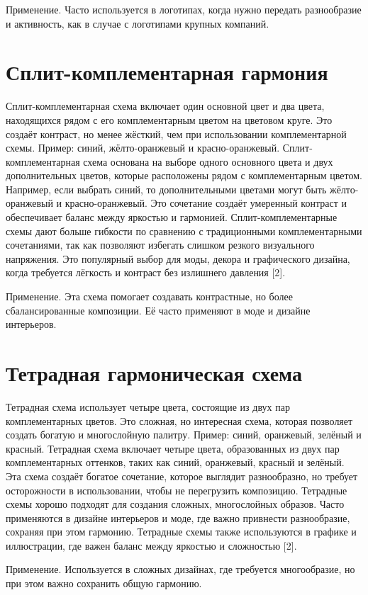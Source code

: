 \documentclass[bachelor, och, referat]{SCWorks}
\begin{document}
Применение. Часто используется в логотипах, когда нужно передать разнообразие и активность, как в случае с логотипами крупных компаний.

\section{Сплит-комплементарная гармония}
Сплит-комплементарная схема включает один основной цвет и два цвета, находящихся рядом с его комплементарным цветом на цветовом круге. Это создаёт контраст, но менее жёсткий, чем при использовании комплементарной схемы. Пример: синий, жёлто-оранжевый и красно-оранжевый.
Сплит-комплементарная схема основана на выборе одного основного цвета и двух дополнительных цветов, которые расположены рядом с комплементарным цветом. Например, если выбрать синий, то дополнительными цветами могут быть жёлто-оранжевый и красно-оранжевый. Это сочетание создаёт умеренный контраст и обеспечивает баланс между яркостью и гармонией.
Сплит-комплементарные схемы дают больше гибкости по сравнению с традиционными комплементарными сочетаниями, так как позволяют избегать слишком резкого визуального напряжения. Это популярный выбор для моды, декора и графического дизайна, когда требуется лёгкость и контраст без излишнего давления [2].

Применение. Эта схема помогает создавать контрастные, но более сбалансированные композиции. Её часто применяют в моде и дизайне интерьеров.

\section{Тетрадная гармоническая схема}
Тетрадная схема использует четыре цвета, состоящие из двух пар комплементарных цветов. Это сложная, но интересная схема, которая позволяет создать богатую и многослойную палитру. Пример: синий, оранжевый, зелёный и красный.
Тетрадная схема включает четыре цвета, образованных из двух пар комплементарных оттенков, таких как синий, оранжевый, красный и зелёный. Эта схема создаёт богатое сочетание, которое выглядит разнообразно, но требует осторожности в использовании, чтобы не перегрузить композицию. Тетрадные схемы хорошо подходят для создания сложных, многослойных образов.
Часто применяются в дизайне интерьеров и моде, где важно привнести разнообразие, сохраняя при этом гармонию. Тетрадные схемы также используются в графике и иллюстрации, где важен баланс между яркостью и сложностью [2].

Применение. Используется в сложных дизайнах, где требуется многообразие, но при этом важно сохранить общую гармонию.
\end{document}
